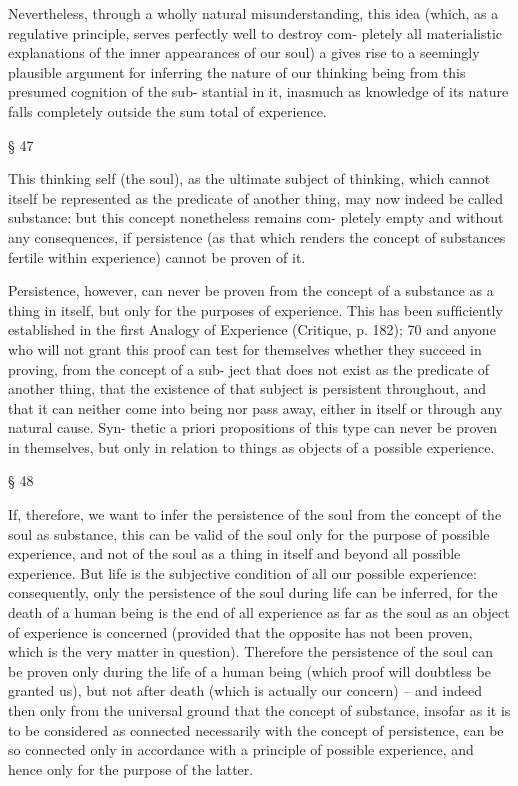 Nevertheless, through a wholly natural misunderstanding, this idea
(which, as a regulative principle, serves perfectly well to destroy com-
pletely all materialistic explanations of the inner appearances of our
soul) a gives rise to a seemingly plausible argument for inferring the
nature of our thinking being from this presumed cognition of the sub-
stantial in it, inasmuch as knowledge of its nature falls completely outside
the sum total of experience.

§ 47

This thinking self (the soul), as the ultimate subject of thinking, which
cannot itself be represented as the predicate of another thing, may now
indeed be called substance: but this concept nonetheless remains com-
pletely empty and without any consequences, if persistence (as that which
renders the concept of substances fertile within experience) cannot be
proven of it.

Persistence, however, can never be proven from the concept of a
substance as a thing in itself, but only for the purposes of experience.
This has been sufﬁciently established in the ﬁrst Analogy of Experience
(Critique, p. 182); 70 and anyone who will not grant this proof can test for
themselves whether they succeed in proving, from the concept of a sub-
ject that does not exist as the predicate of another thing, that the existence
of that subject is persistent throughout, and that it can neither come into
being nor pass away, either in itself or through any natural cause. Syn-
thetic a priori propositions of this type can never be proven in themselves,
but only in relation to things as objects of a possible experience.

§ 48

If, therefore, we want to infer the persistence of the soul from the concept
of the soul as substance, this can be valid of the soul only for the purpose of
possible experience, and not of the soul as a thing in itself and beyond all
possible experience. But life is the subjective condition of all our possible
experience: consequently, only the persistence of the soul during life can
be inferred, for the death of a human being is the end of all experience
as far as the soul as an object of experience is concerned (provided that
the opposite has not been proven, which is the very matter in question).
Therefore the persistence of the soul can be proven only during the life
of a human being (which proof will doubtless be granted us), but not
after death (which is actually our concern) – and indeed then only from
the universal ground that the concept of substance, insofar as it is to
be considered as connected necessarily with the concept of persistence,
can be so connected only in accordance with a principle of possible
experience, and hence only for the purpose of the latter.

